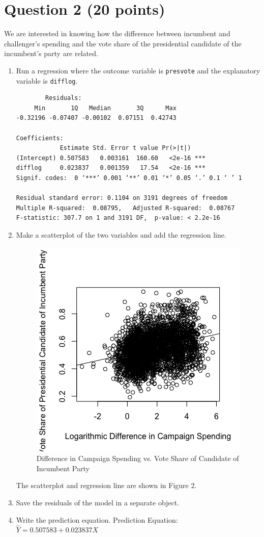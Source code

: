 \documentclass[12pt,letterpaper]{article}
\begin{document}
\newpage

\section*{Question 2 (20 points)}
\noindent We are interested in knowing how the difference between incumbent and challenger's spending and the vote share of the presidential candidate of the incumbent's party are related.	\vspace{.25cm}
	\begin{enumerate}
		\item Run a regression where the outcome variable is \texttt{presvote} and the explanatory variable is \texttt{difflog}.
		  
		\begin{verbatim}
		Residuals:
     Min       1Q   Median       3Q      Max 
-0.32196 -0.07407 -0.00102  0.07151  0.42743 

Coefficients:
            Estimate Std. Error t value Pr(>|t|)    
(Intercept) 0.507583   0.003161  160.60   <2e-16 ***
difflog     0.023837   0.001359   17.54   <2e-16 ***
Signif. codes:  0 ‘***’ 0.001 ‘**’ 0.01 ‘*’ 0.05 ‘.’ 0.1 ‘ ’ 1

Residual standard error: 0.1104 on 3191 degrees of freedom
Multiple R-squared:  0.08795,	Adjusted R-squared:  0.08767 
F-statistic: 307.7 on 1 and 3191 DF,  p-value: < 2.2e-16
		\end{verbatim}
		\vspace{.1cm}
		\item Make a scatterplot of the two variables and add the regression line. 	
		  
		\begin{figure}[h!]
			\caption{\footnotesize{Difference in Campaign Spending vs. Vote Share of Candidate of Incumbent Party}}
			\vspace{.001cm}
			\centering
			\label{fig:graph2}
			\includegraphics[width=.5\textwidth]{./PS3_Graph_2.png}
		\end{figure}
		The scatterplot and regression line are shown in Figure 2.
		\vspace{.1cm}
		\item Save the residuals of the model in a separate object.
		  
		\vspace{.3cm}
		\item Write the prediction equation.
		Prediction Equation: ${\hat{Y} = 0.507583 + 0.023837X}$
	\end{enumerate}
	
\end{document}
